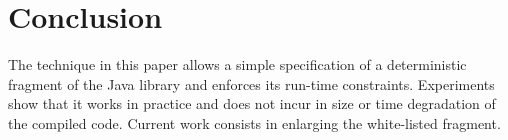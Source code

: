 \section{Conclusion}\label{sec:conclusion}

The technique in this paper allows a simple
specification of a deterministic fragment of the Java library and
enforces its run-time constraints.
Experiments show that it works in practice and does not incur
in size or time degradation of the compiled code.
Current work consists in enlarging the white-listed fragment.

